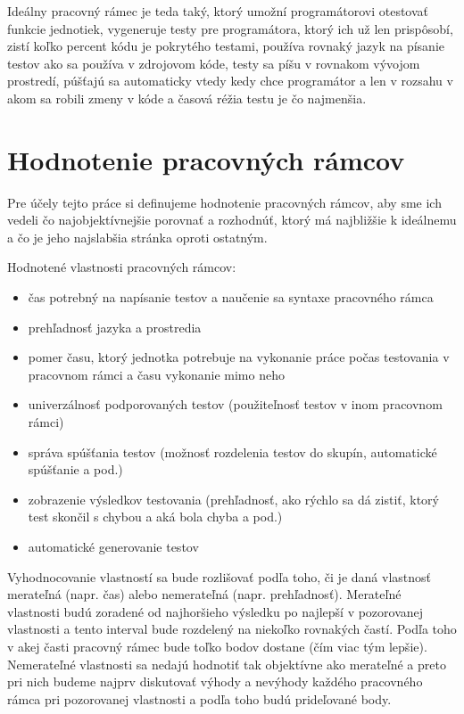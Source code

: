 \documentclass[11pt,twoside,slovak,a4paper]{article}
\begin{document}
		Ideálny pracovný rámec je teda taký, ktorý umožní programátorovi otestovať funkcie jednotiek, vygeneruje testy pre programátora, ktorý ich už len prispôsobí, zistí koľko percent kódu je pokrytého testami, používa rovnaký jazyk na písanie testov ako sa používa v zdrojovom kóde, testy sa píšu v rovnakom vývojom prostredí, púšťajú sa automaticky vtedy kedy chce programátor a len v rozsahu v akom sa robili zmeny v kóde a časová réžia testu je čo najmenšia.
	
	\newpage
	\section{Hodnotenie pracovných rámcov}	
	Pre účely tejto práce si definujeme hodnotenie pracovných rámcov, aby sme ich vedeli čo najobjektívnejšie porovnať a rozhodnúť, ktorý má najbližšie k ideálnemu a čo je jeho najslabšia stránka oproti ostatným.
	
	Hodnotené vlastnosti pracovných rámcov:
	\begin{itemize}
		\item čas potrebný na napísanie testov a naučenie sa syntaxe pracovného rámca
		\item prehľadnosť jazyka a prostredia
		\item pomer času, ktorý jednotka potrebuje na vykonanie práce počas testovania v pracovnom rámci a času vykonanie mimo neho
		\item univerzálnosť podporovaných testov (použiteľnosť testov v inom pracovnom rámci)
		\item správa spúšťania testov (možnosť rozdelenia testov do skupín, automatické spúšťanie a pod.)
		\item zobrazenie výsledkov testovania (prehľadnosť, ako rýchlo sa dá zistiť, ktorý test skončil s chybou a aká bola chyba a pod.)
		\item automatické generovanie testov
	\end{itemize}
	
	Vyhodnocovanie vlastností sa bude rozlišovať podľa toho, či je daná vlastnosť merateľná (napr. čas) alebo nemerateľná (napr. prehľadnosť). 
	Merateľné vlastnosti budú zoradené od najhoršieho výsledku po najlepší v pozorovanej vlastnosti a tento interval bude rozdelený na niekoľko rovnakých častí. Podľa toho v akej časti pracovný rámec bude toľko bodov dostane (čím viac tým lepšie). 
	Nemerateľné vlastnosti sa nedajú hodnotiť tak objektívne ako merateľné a preto pri nich budeme najprv diskutovať výhody a nevýhody každého pracovného rámca pri pozorovanej vlastnosti a podľa toho budú prideľované body.
	
\end{document}
